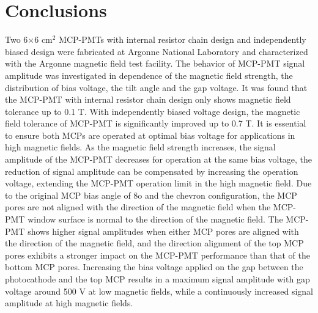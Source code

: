 \documentclass[preprint,5p]{elsarticle}
\begin{document}
\section{Conclusions}
Two 6$\times$6 cm$^2$ MCP-PMTs with internal resistor chain design and 
independently biased design were fabricated at Argonne National Laboratory and 
characterized with the Argonne magnetic field test facility. The behavior of 
MCP-PMT signal amplitude was investigated in dependence of the magnetic field 
strength, the distribution of bias voltage, the tilt angle and the gap voltage.  
It was found that the MCP-PMT with internal resistor chain design only shows 
magnetic field tolerance up to 0.1 T. With independently biased voltage design, 
the magnetic field tolerance of MCP-PMT is significantly improved up to 0.7 T.  
It is essential to ensure both MCPs are operated at optimal bias voltage for 
applications in high magnetic fields. As the magnetic field strength increases, 
the signal amplitude of the MCP-PMT decreases for operation at the same bias 
voltage, the reduction of signal amplitude can be compensated by increasing the 
operation voltage, extending the MCP-PMT operation limit in the high magnetic 
field. Due to the original MCP bias angle of 8o and the chevron configuration, 
the MCP pores are not aligned with the direction of the magnetic field when the 
MCP-PMT window surface is normal to the direction of the magnetic field. The 
MCP-PMT shows higher signal amplitudes when either MCP pores are aligned with 
the direction of the magnetic field, and the direction alignment of the top MCP 
pores exhibits a stronger impact on the MCP-PMT performance than that of the 
bottom MCP pores. Increasing the bias voltage applied on the gap between the 
photocathode and the top MCP results in a maximum signal amplitude with gap 
voltage around 500 V at low magnetic fields, while a continuously increased 
signal amplitude at high magnetic fields. 

  
\end{document}

